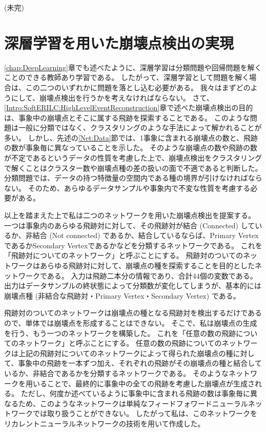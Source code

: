 (未完)

\section{深層学習を用いた崩壊点検出の実現} \label{Net:forVertexFinderwithDL}

\ref{chap:DeepLearning}章でも述べたように、深層学習は分類問題や回帰問題を解くことのできる教師あり学習である。
したがって、深層学習として問題を解く場合は、この二つのいずれかに問題を落とし込む必要がある。
我々はまずどのようにして、崩壊点検出を行うかを考えなければならない。
さて、\ref{Intro:SoftERILC:HighLevelEventReconstruction}章で述べた崩壊点検出の目的は、事象中の崩壊点とそこに属する飛跡を探索することである。
このような問題は一般に分類ではなく、クラスタリングのような手法によって解かれることが多い。
しかし、先述の\ref{Net:Data}節では、1事象に含まれる崩壊点の数と、飛跡の数が事象毎に異なっていることを示した。
そのような崩壊点の数や飛跡の数が不定であるというデータの性質を考慮した上で、崩壊点検出をクラスタリングで解くことはクラスター数や崩壊点種の差の扱いの面で不適であると判断した。
分類問題では、データの持つ特徴量の空間内である種の境界が引けなければならない。
そのため、あらゆるデータサンプルや事象内で不変な性質を考慮する必要がある。

以上を踏まえた上で私は二つのネットワークを用いた崩壊点検出を提案する。
一つは事象内のあらゆる飛跡対に対して、その飛跡対が結合 (Connected) しているか、非結合 (Not connected) であるか、結合しているならば、Primary VertexであるかSecondary Vertexであるかなどを分類するネットワークである。
これを「飛跡対についてのネットワーク」と呼ぶことにする。
飛跡対のついてのネットワークはあらゆる飛跡対に対して、崩壊点の種を探索することを目的としたネットワークである。
入力は飛跡二本分の情報であり、合計$44$個の変数である。
出力はデータサンプルの終状態によって分類数が変化してしまうが、基本的には崩壊点種 (非結合な飛跡対・Primary Vertex・Secondary Vertex) である。

飛跡対のついてのネットワークは崩壊点の種となる飛跡対を検出するだけであるので、単体では崩壊点を形成することはできない。
そこで、私は崩壊点の生成を行う、もう一つのネットワークを構築した。
これを「任意の数の飛跡についてのネットワーク」と呼ぶことにする。
任意の数の飛跡についてのネットワークは上記の飛跡対についてのネットワークによって得られた崩壊点の種に対して、事象中の飛跡を一本ずつ加え、それぞれの飛跡がその崩壊点の種と結合しているか、非結合であるかを分類するネットワークである。
そのようなネットワークを用いることで、最終的に事象中の全ての飛跡を考慮した崩壊点が生成される。
ただし、何度か述べているように事象中に含まれる飛跡の数は事象毎に異なるため、このようなネットワークは単純なフィードフォワードニューラルネットワークでは取り扱うことができない。
したがって私は、このネットワークをリカレントニューラルネットワークの技術を用いて作成した。


